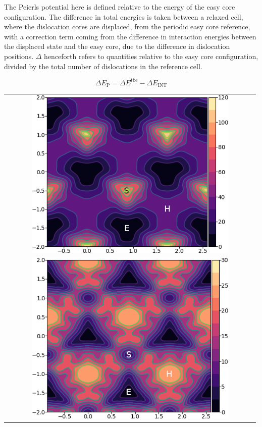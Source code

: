 \documentclass[a4paper,11pt]{article}
\begin{document}
The Peierls potential here is defined relative to the energy of the easy core configuration. The
difference in total energies is taken between a relaxed cell, where the dislocation cores are
displaced, from the periodic easy core reference, with a correction term coming from the
difference in interaction energies between the displaced state and the easy core, due to the
difference in dislocation positions. \(\Delta\) henceforth refers to quantities relative to the easy
core configuration, divided by the total number of dislocations in the reference cell. 

\[ \Delta E_{\text{P}} = \Delta E^{\text{tbe}} - \Delta E_{\text{INT}} \]



        \begin{table}
    \begin{tabular}{c}
	     \includegraphics[width=0.8\textwidth]{../Images/itakura_dislocation_energy_landscape_2_labelled.png} \\
             \includegraphics[width=0.8\textwidth]{../Images/tbe_dislocation_energy_landscape_pure_labelled.png}  \\

\end{tabular}
\end{table}
\end{document}
